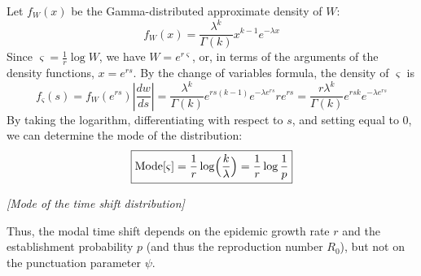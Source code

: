  Let $f_W(x)$ be the Gamma-distributed approximate density of $W$: 
\begin{equation}
	f_W(x) = \frac{\lambda^k}{\Gamma(k)} x^{k-1} e^{-\lambda x}
\end{equation}
Since $\varsigma = \frac{1}{r} \log W$, we have $W = e^{r \varsigma}$, or, in terms of the arguments of the density functions, $x = e^{r s}$. By the change of variables formula, the density of $\varsigma$ is 
\begin{equation}
f_\varsigma(s) = f_W(e^{rs}) |\frac{dw}{ds}| = 
\frac{\lambda^k}{\Gamma(k)} e^{rs(k-1)} e^{-\lambda e^{rs}} r e^{rs} = \frac{r \lambda^k}{\Gamma(k)} e^{rsk} e^{-\lambda e^{rs}}
\label{eq:varsigma_dist}
\end{equation}
By taking the logarithm, differentiating with respect to $s$, and setting equal to 0, we can determine the mode of the distribution: 
\begin{equation}
	\boxed{\text{Mode}[\varsigma] = \frac{1}{r} \log \Bigl(\frac{k}{\lambda}\Bigr) = \frac{1}{r} \log \frac{1}{p}}
	\label{eq:varsigma_mode}
\end{equation}
\begin{center}
	{\it [Mode of the time shift distribution]}
\end{center}
Thus, the modal time shift depends on the epidemic growth rate $r$ and the establishment probability $p$ (and thus the reproduction number $R_0$), but not on the punctuation parameter $\psi$. 


